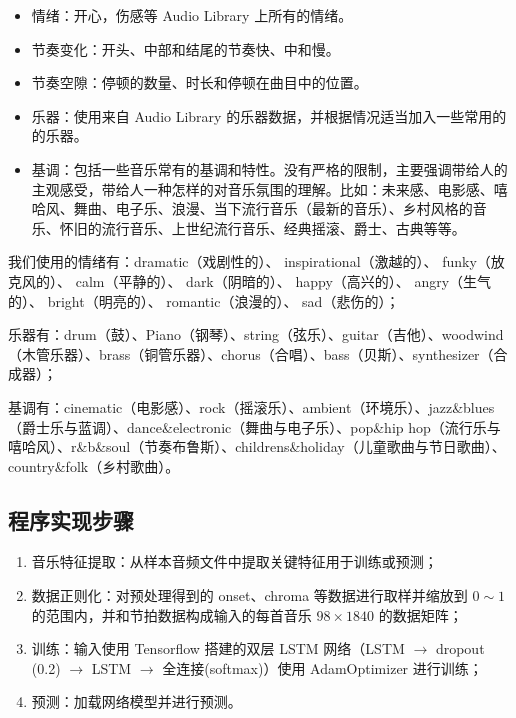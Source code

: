 \documentclass[a4paper,utf8,10pt]{article}
\newcommand{\sept}{\setlength\itemsep{-4pt}}
\begin{document}
\begin{itemize}
  \sept
  \item 情绪：开心，伤感等 Audio Library 上所有的情绪。
  \item 节奏变化：开头、中部和结尾的节奏快、中和慢。
  \item 节奏空隙：停顿的数量、时长和停顿在曲目中的位置。
  \item 乐器：使用来自 Audio Library 的乐器数据，并根据情况适当加入一些常用的的乐器。
  \item 基调：包括一些音乐常有的基调和特性。没有严格的限制，主要强调带给人的主观感受，带给人一种怎样的对音乐氛围的理解。比如：未来感、电影感、嘻哈风、舞曲、电子乐、浪漫、当下流行音乐（最新的音乐）、乡村风格的音乐、怀旧的流行音乐、上世纪流行音乐、经典摇滚、爵士、古典等等。
\end{itemize}

我们使用的情绪有：dramatic（戏剧性的）、 inspirational（激越的）、 funky（放克风的）、 calm（平静的）、 dark（阴暗的）、 happy（高兴的）、 angry（生气的）、 bright（明亮的）、 romantic（浪漫的）、 sad（悲伤的）；

乐器有：drum（鼓）、Piano（钢琴）、string（弦乐）、guitar（吉他）、woodwind（木管乐器）、brass（铜管乐器）、chorus（合唱）、bass（贝斯）、synthesizer（合成器）；

基调有：cinematic（电影感）、rock（摇滚乐）、ambient（环境乐）、jazz\&blues（爵士乐与蓝调）、dance\&electronic（舞曲与电子乐）、pop\&hip hop（流行乐与嘻哈风）、r\&b\&soul（节奏布鲁斯）、childrens\&holiday（儿童歌曲与节日歌曲）、country\&folk（乡村歌曲）。

\subsection{程序实现步骤}

\begin{enumerate}
  \sept
  \item 音乐特征提取：从样本音频文件中提取关键特征用于训练或预测；
  \item 数据正则化：对预处理得到的 onset、chroma 等数据进行取样并缩放到 $0 \sim 1$ 的范围内，并和节拍数据构成输入的每首音乐 $98 \times 1840$ 的数据矩阵；
  \item 训练：输入使用 Tensorflow 搭建的双层 LSTM 网络（LSTM $\rightarrow$ dropout (0.2) $\rightarrow$ LSTM $\rightarrow$ 全连接(softmax)）使用 AdamOptimizer 进行训练；
  \item 预测：加载网络模型并进行预测。
\end{enumerate}
\end{document}
